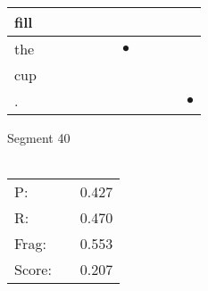\documentclass[landscape]{article}
\newcommand{\ssp}{\hspace{2pt}}
\newcommand{\mex}{\cellcolor{g}$\bullet$}
\begin{document}
\begin{tabular}{|l|p{10pt}|p{10pt}|p{10pt}|p{10pt}|p{10pt}|p{10pt}|p{10pt}|p{10pt}|p{10pt}|p{10pt}|}
\hline
\ssp fill \ssp&\hspace{2pt}&\hspace{2pt}&\hspace{2pt}&\hspace{2pt}&\hspace{2pt}&\hspace{2pt}&\hspace{2pt}&\hspace{2pt}&\hspace{2pt}&\hspace{2pt}\\
\hline
\ssp \cellcolor{ref5}the \ssp&\hspace{2pt}&\hspace{2pt}&\hspace{2pt}&\hspace{2pt}&\hspace{2pt}&\hspace{2pt}\mex&\hspace{2pt}&\hspace{2pt}&\hspace{2pt}&\hspace{2pt}\\
\hline
\ssp cup \ssp&\hspace{2pt}&\hspace{2pt}&\hspace{2pt}&\hspace{2pt}&\hspace{2pt}&\hspace{2pt}&\hspace{2pt}&\hspace{2pt}&\hspace{2pt}&\hspace{2pt}\\
\hline
\ssp \cellcolor{ref9}. \ssp&\hspace{2pt}&\hspace{2pt}&\hspace{2pt}&\hspace{2pt}&\hspace{2pt}&\hspace{2pt}&\hspace{2pt}&\hspace{2pt}&\hspace{2pt}&\hspace{2pt}\mex\\
\hline
\end{tabular}

\vspace{6pt}
\noindent Segment 40\\\\
\noindent\begin{tabular}{lm{12pt}r}
\hline
P:&&0.427\\
R:&&0.470\\
Frag:&&0.553\\
Score:&&0.207\\
\end{tabular}
\end{document}
